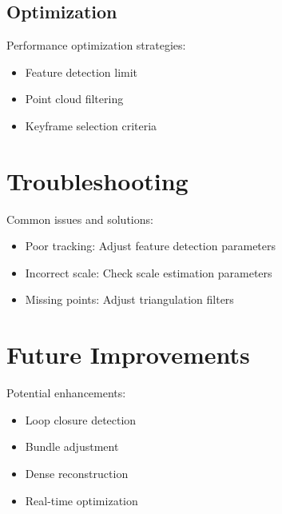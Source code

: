 \documentclass[11pt,a4paper]{article}
\begin{document}
\subsection{Optimization}
Performance optimization strategies:
\begin{itemize}
    \item Feature detection limit
    \item Point cloud filtering
    \item Keyframe selection criteria
\end{itemize}

\section{Troubleshooting}
Common issues and solutions:
\begin{itemize}
    \item Poor tracking: Adjust feature detection parameters
    \item Incorrect scale: Check scale estimation parameters
    \item Missing points: Adjust triangulation filters
\end{itemize}

\section{Future Improvements}
Potential enhancements:
\begin{itemize}
    \item Loop closure detection
    \item Bundle adjustment
    \item Dense reconstruction
    \item Real-time optimization
\end{itemize}
\end{document}
